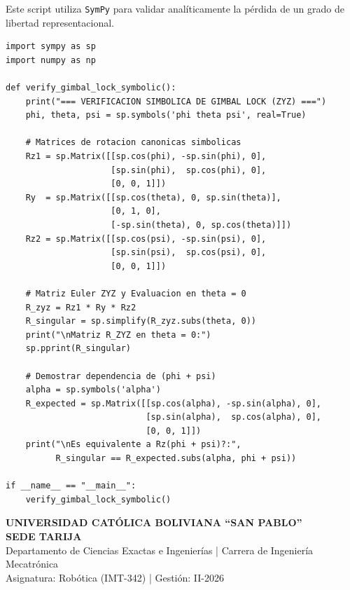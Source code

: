 \documentclass[11pt, a4paper]{article}
\begin{document}
\vspace{0.4cm}
\begin{tcolorbox}[colback=white, colframe=ucbblue, title=\textbf{Código Maestro de Verificación (Referencia Docente)}]
Este script utiliza \texttt{SymPy} para validar analíticamente la pérdida de un grado de libertad representacional.
\vspace{-0.2cm}
\begin{lstlisting}
import sympy as sp
import numpy as np

def verify_gimbal_lock_symbolic():
    print("=== VERIFICACION SIMBOLICA DE GIMBAL LOCK (ZYZ) ===")
    phi, theta, psi = sp.symbols('phi theta psi', real=True)
    
    # Matrices de rotacion canonicas simbolicas
    Rz1 = sp.Matrix([[sp.cos(phi), -sp.sin(phi), 0],
                     [sp.sin(phi),  sp.cos(phi), 0],
                     [0, 0, 1]])
    Ry  = sp.Matrix([[sp.cos(theta), 0, sp.sin(theta)],
                     [0, 1, 0],
                     [-sp.sin(theta), 0, sp.cos(theta)]])
    Rz2 = sp.Matrix([[sp.cos(psi), -sp.sin(psi), 0],
                     [sp.sin(psi),  sp.cos(psi), 0],
                     [0, 0, 1]])
    
    # Matriz Euler ZYZ y Evaluacion en theta = 0
    R_zyz = Rz1 * Ry * Rz2
    R_singular = sp.simplify(R_zyz.subs(theta, 0))
    print("\nMatriz R_ZYZ en theta = 0:")
    sp.pprint(R_singular)
    
    # Demostrar dependencia de (phi + psi)
    alpha = sp.symbols('alpha')
    R_expected = sp.Matrix([[sp.cos(alpha), -sp.sin(alpha), 0],
                            [sp.sin(alpha),  sp.cos(alpha), 0],
                            [0, 0, 1]])
    print("\nEs equivalente a Rz(phi + psi)?:", 
          R_singular == R_expected.subs(alpha, phi + psi))

if __name__ == "__main__":
    verify_gimbal_lock_symbolic()
\end{lstlisting}
\end{tcolorbox}

\newpage
\begin{center}
    \Large\textbf{\textcolor{ucbblue}{UNIVERSIDAD CATÓLICA BOLIVIANA ``SAN PABLO''}}\\
    \large\textbf{SEDE TARIJA}\\
    \vspace{0.2cm}
    \normalsize Departamento de Ciencias Exactas e Ingenierías | Carrera de Ingeniería Mecatrónica\\
    Asignatura: Robótica (IMT-342) | Gestión: II-2026
\end{center}
\end{document}
